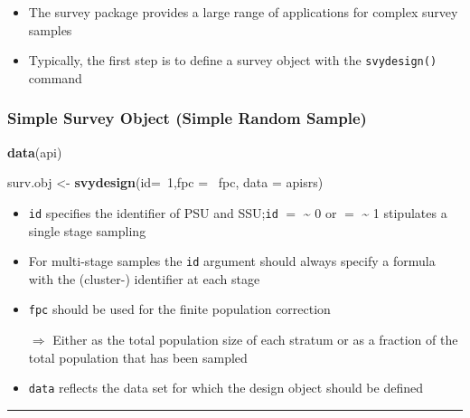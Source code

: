 \documentclass[]{article}
\newenvironment{Shaded}{\begin{snugshade}}{\end{snugshade}}
\newcommand{\KeywordTok}[1]{\textcolor[rgb]{0.13,0.29,0.53}{\textbf{{#1}}}}
\newcommand{\DataTypeTok}[1]{\textcolor[rgb]{0.13,0.29,0.53}{{#1}}}
\newcommand{\DecValTok}[1]{\textcolor[rgb]{0.00,0.00,0.81}{{#1}}}
\newcommand{\StringTok}[1]{\textcolor[rgb]{0.31,0.60,0.02}{{#1}}}
\newcommand{\NormalTok}[1]{{#1}}
\providecommand{\tightlist}{%
  \setlength{\itemsep}{0pt}\setlength{\parskip}{0pt}}
\begin{document}
\begin{itemize}
\tightlist
\item
  The survey package provides a large range of applications for complex
  survey samples
\item
  Typically, the first step is to define a survey object with the
  \texttt{svydesign()} command
\end{itemize}

\subsubsection{Simple Survey Object (Simple Random
Sample)}\label{simple-survey-object-simple-random-sample}

\begin{Shaded}
\begin{Highlighting}[]
\KeywordTok{data}\NormalTok{(api)}

\NormalTok{surv.obj <-}\StringTok{ }\KeywordTok{svydesign}\NormalTok{(}\DataTypeTok{id=}\NormalTok{~}\DecValTok{1}\NormalTok{,}\DataTypeTok{fpc =} \NormalTok{~fpc, }\DataTypeTok{data =} \NormalTok{apisrs)}
\end{Highlighting}
\end{Shaded}

\begin{itemize}
\item
  \texttt{id} specifies the identifier of PSU and SSU;\texttt{id} \(=\)
  \textasciitilde{} 0 or \(=\) \textasciitilde{} 1 stipulates a single
  stage sampling
\item
  For multi-stage samples the \texttt{id} argument should always specify
  a formula with the (cluster-) identifier at each stage
\item
  \texttt{fpc} should be used for the finite population correction

  \(\Rightarrow\) Either as the total population size of each stratum or
  as a fraction of the total population that has been sampled\\
\item
  \texttt{data} reflects the data set for which the design object should
  be defined
\end{itemize}

\begin{center}\rule{0.5\linewidth}{\linethickness}\end{center}
\end{document}
